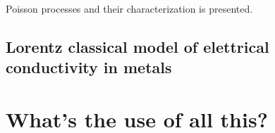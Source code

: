 


\begin{refsection}

   Poisson processes and their characterization is presented.


   \begin{advanced}
   \section{Lorentz classical model of elettrical conductivity in metals}
\end{advanced}

   \section{What's the use of all this?}   


\printbibliography[heading=subbibliography]
\end{refsection}
